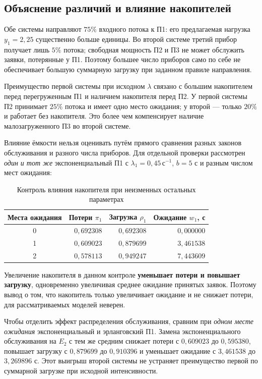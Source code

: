 \documentclass[a4paper,12pt]{article}
\newcommand{\secunit}{\,\text{с}^{-1}}
\begin{document}
\subsection{Объяснение различий и влияние накопителей}
Обе системы направляют $75\%$ входного потока к П1: его предлагаемая нагрузка $y_1=2{,}25$ существенно больше единицы. Во второй системе третий прибор получает лишь $5\%$ потока; свободная мощность П2 и П3 не может обслужить заявки, потерянные у П1. Поэтому большее число приборов само по себе не обеспечивает большую суммарную загрузку при заданном правиле направления.

Преимущество первой системы при исходном $\lambda$ связано с большим накопителем перед перегруженным П1 и наличием накопителя перед П2. У первой системы П2 принимает $25\%$ потока и имеет одно место ожидания; у второй --- только $20\%$ и работает без накопителя. Это более чем компенсирует наличие малозагруженного П3 во второй системе.

Влияние ёмкости нельзя оценивать путём прямого сравнения разных законов обслуживания и разного числа приборов. Для отдельной проверки рассмотрен \emph{один и тот же} экспоненциальный П1 с $\lambda_1=0{,}45\secunit$, $b=5$ с и разным числом мест ожидания:

\begin{table}[H]\centering\small
\caption{Контроль влияния накопителя при неизменных остальных параметрах}
\begin{tabular}{@{}crrr@{}}\toprule
Места ожидания & Потери $\pi_1$ & Загрузка $\rho_1$ & Ожидание $w_1$, с\\\midrule
0 & $0{,}692308$ & $0{,}692308$ & $0{,}000000$ \\
1 & $0{,}609023$ & $0{,}879699$ & $3{,}461538$ \\
2 & $0{,}578113$ & $0{,}949247$ & $7{,}443609$ \\
\bottomrule\end{tabular}
\end{table}

Увеличение накопителя в данном контроле \textbf{уменьшает потери и повышает загрузку}, одновременно увеличивая среднее ожидание принятых заявок. Поэтому вывод о том, что накопитель только увеличивает ожидание и не снижает потери, для рассматриваемых моделей неверен.

Чтобы отделить эффект распределения обслуживания, сравним при \emph{одном месте ожидания} экспоненциальный и эрланговский П1. Замена экспоненциального обслуживания на $E_2$ с тем же средним снижает потери с $0{,}609023$ до $0{,}595380$, повышает загрузку с $0{,}879699$ до $0{,}910396$ и уменьшает ожидание с $3{,}461538$ до $3{,}269896$ с. Этот выигрыш второй системы не устраняет преимущество первой по суммарной загрузке при исходной интенсивности.
\end{document}
